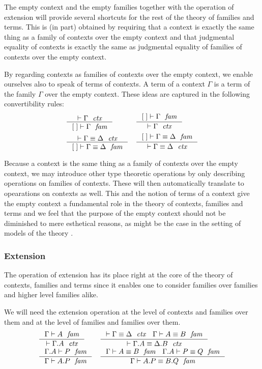 The empty context and the empty families together with the operation of
extension will provide several shortcuts for the rest
of the theory of families and terms. This is (in part) obtained by requiring
that a context is exactly the same thing as a family of contexts over the
empty context and that judgmental equality of contexts is exactly the same
as judgmental equality of families of contexts over the empty context. 

By regarding contexts as families of contexts over the empty context, we
enable ourselves also to speak of terms of contexts. A term of a context
$\Gamma$ is a term of the family $\Gamma$ over the empty context. These ideas
are captured in the following convertibility rules:
\begin{align}
& \inference
  { \jctx{\Gamma}
    }
  { \jfam{\emptyc}{\Gamma}
    } 
& & \inference
    { \jfam{\emptyc}{\Gamma}
      }
    { \jctx{\Gamma}
      }
    \\
& \inference
  { \jctxeq{\Gamma}{\Delta}
    }
  { \jfameq{\emptyc}{\Gamma}{\Delta}
    }
& & \inference
    { \jfameq{\emptyc}{\Gamma}{\Delta}
      }
    { \jctxeq{\Gamma}{\Delta}
      }
\end{align}

Because a context is the same thing as a family of contexts over the empty
context, we may introduce other type theoretic operations by only describing
operations on families of contexts. These will then automatically translate
to opearations on contexts as well. This and the notion of terms of a context
give the empty context a fundamental role in the theory of contexts, families
and terms and we feel that the purpose of the empty context should not be
diminished to mere esthetical reasons, as might be the case in the setting
of models of the theory \cite{Awodey2013}.

\subsubsection{Extension}
\label{extension}
The operation of extension has its place right at the core of the theory of
contexts, families and terms since it enables one to consider families over
families and higher level families alike.

We will need the extension operation at the level of contexts and families 
over them and at the level of families and families over them. 
\begin{align}
& \inference
  { \jfam{\Gamma}{A}
    }
  { \jctx{\ctxext{\Gamma}{A}}
    }
& & \inference
    { \jctxeq{\Gamma}{\Delta}
      \jfameq{\Gamma}{A}{B}
      }
    { \jctxeq{\ctxext{\Gamma}{A}}{\ctxext{\Delta}{B}}
      }
    \\
& \inference
  { \jfam{{\Gamma}{A}}{P}
    }
  { \jfam{\Gamma}{\ctxext{A}{P}}
    }
& & \inference
    { \jfameq{\Gamma}{A}{B} 
      \jfameq{{\Gamma}{A}}{P}{Q}
      }
    { \jfameq{\Gamma}{\ctxext{A}{P}}{\ctxext{B}{Q}}
      }
\end{align}

